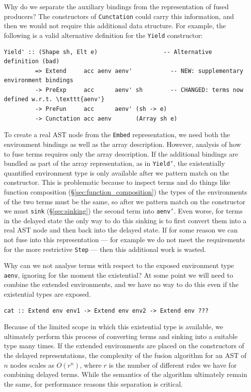 Why do we separate the auxiliary bindings from the representation of fused
producers? The constructors of \texttt{Cunctation} could carry this information,
and then we would not require this additional data structure. For example, the
following is a valid alternative definition for the \texttt{Yield} constructor:
%
\begin{lstlisting}[style=haskell]
  Yield' :: (Shape sh, Elt e)                   -- Alternative definition (bad)
         => Extend     acc aenv aenv'           -- NEW: supplementary environment bindings
         -> PreExp     acc      aenv' sh        -- CHANGED: terms now defined w.r.t. \texttt{aenv'}
         -> PreFun     acc      aenv' (sh -> e)
         -> Cunctation acc aenv       (Array sh e)
\end{lstlisting}

To create a real AST node from the \texttt{Embed}
representation, we need both the environment bindings as well as the array
description. However, analysis of how to fuse terms requires only the array
description. If the additional bindings are bundled as part of the array
representation, as in \texttt{Yield'}, the existentially quantified environment
type is only available after we pattern match on the constructor.
This is problematic because to inspect terms and do things like function
composition (\S\ref{sec:function_composition}) the types of the environments of
the two terms must be the same, so after we pattern match on the constructor we
must \texttt{sink} (\S\ref{sec:sinking}) the second term into \texttt{aenv'}.
Even worse, for terms in the delayed state the only way to do this sinking is to
first convert them into a real AST node and then back into the delayed state. If
for some reason we can not fuse into this representation --- for example we do
not meet the requirements for the more restrictive \texttt{Step} --- then this
additional work is wasted.

Why can we not analyse terms with respect to the exposed environment type
\texttt{aenv}, ignoring for the moment the existential? At some point we will
need to combine the extended environments, and we have no way to do this even if
the existential types are exposed.
%
\begin{lstlisting}[style=haskell]
cat :: Extend env env1 -> Extend env env2 -> Extend env ???
\end{lstlisting}

Because of the limited scope in which this existential type is available, we
ultimately perform this process of converting terms and sinking into a suitable
type many times. If the extended environments are placed on the constructors of
the delayed representations, the complexity of the fusion algorithm for an AST
of $n$ nodes scales as $O(r^n)$, where $r$ is the number of different rules we
have for combining delayed terms. While the semantics of the algorithm
ultimately remain the same, for performance reasons this separation is critical.


